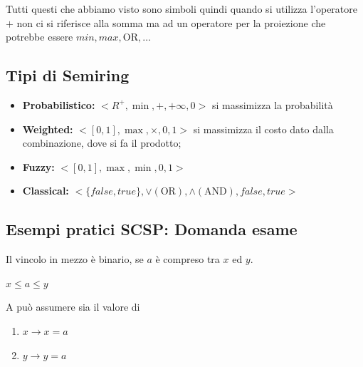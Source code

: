 Tutti questi che abbiamo visto sono simboli quindi quando si utilizza
l'operatore $+$ non ci si riferisce alla somma ma ad un operatore per la
proiezione che potrebbe essere $min, max, \text{OR}, \ldots$
\subsection{Tipi di Semiring}
\begin{itemize}
    \item \textbf{Probabilistico:} $<R^+, \min, +, +\infty, 0>$ si massimizza
          la probabilità
    \item \textbf{Weighted:} $<[0, 1], \max, \times, 0, 1>$ si massimizza il costo dato dalla
          combinazione, dove si fa il prodotto;
    \item \textbf{Fuzzy:} $<[0,1], \max, \min, 0, 1>$
    \item \textbf{Classical:} $<\{false,true\}, \lor(\text{OR}), \land(\text{AND}),
              false, true>$
\end{itemize}

\subsection{Esempi pratici SCSP: Domanda esame}
Il vincolo in mezzo è binario, se $a$ è compreso tra $x$ ed $y$.
\begin{center}
    $x \leq a \leq y$
\end{center}
A può assumere sia il valore di
\begin{enumerate}
    \item $x \rightarrow x = a$
    \item $y \rightarrow y = a$
\end{enumerate}
